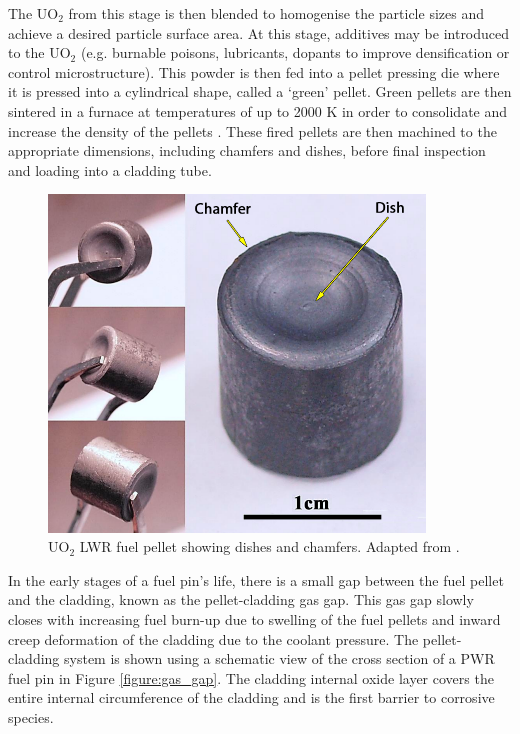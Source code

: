 The UO$_{2}$ from this stage is then blended to homogenise the particle sizes and achieve a desired particle surface area. At this stage, additives may be introduced to the UO$_{2}$ (e.g. burnable poisons, lubricants, dopants to improve densification or control microstructure). This powder is then fed into a pellet pressing die where it is pressed into a cylindrical shape, called a `green' pellet. Green pellets are then sintered in a furnace at temperatures of up to 2000 K in order to consolidate and increase the density of the pellets \cite{pramanik2010innovative}. These fired pellets are then machined to the appropriate dimensions, including chamfers and dishes, before final inspection and loading into a cladding tube.

\begin{figure}[ht]
\centering
\includegraphics[width=10cm]{images/fuelpellet.png}
\caption[UO$_{2}$ LWR fuel pellet showing dishes and chamfers.]{UO$_{2}$ LWR fuel pellet showing dishes and chamfers. Adapted from \cite{tulenko2013development}.}
\label{figure:fuelpellet}
\end{figure}

In the early stages of a fuel pin's life, there is a small gap between the fuel pellet and the cladding, known as the pellet-cladding gas gap. This gas gap slowly closes with increasing fuel burn-up due to swelling of the fuel pellets and inward creep deformation of the cladding due to the coolant pressure. The pellet-cladding system is shown using a schematic view of the cross section of a PWR fuel pin in Figure \ref{figure:gas_gap}. The cladding internal oxide layer covers the entire internal circumference of the cladding and is the first barrier to corrosive species. 

